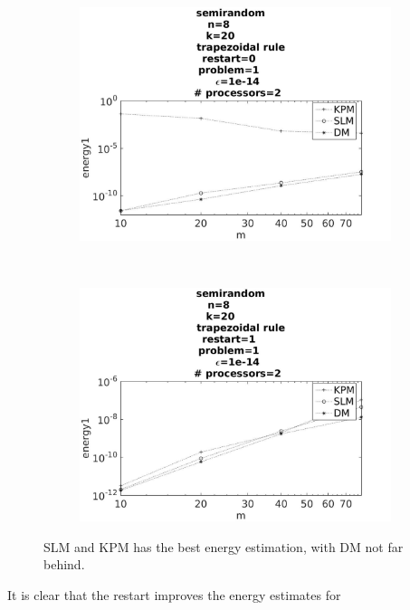 \begin{figure}[H]
        \centering
        \begin{subfigure}[b]{0.45\textwidth}
                \includegraphics[width=\textwidth]{../MATLAB/fig/vsresultenergyr.jpg}
                \caption{  }
                \label{fig:vsresultenergy1}
        \end{subfigure}
        ~
        \begin{subfigure}[b]{0.45\textwidth}
                \includegraphics[width=\textwidth]{../MATLAB/fig/vsresultenergy.jpg}
                \caption{  }
                \label{fig:vsresultenergy2}
        \end{subfigure}
        \caption{ SLM and KPM has the best energy estimation, with DM not far behind. }
        \label{fig:vsresultenergy}
\end{figure}
It is clear that the restart improves the energy estimates for 